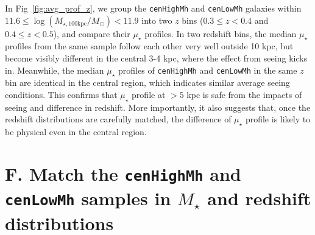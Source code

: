 \documentclass{emulateapj}
\def\rbcg{\texttt{cenHighMh}}
\def\nbcg{\texttt{cenLowMh}}
\def\mstar{{$M_{\star}$}}
\def\logmtot{{$\log (M_{\star,100\mathrm{kpc}}/M_{\odot})$}}
\def\mden{{$\mu_{\star}$}}
\begin{document}
\begin{CJK*}{UTF8}{gbsn}
    In Fig~\ref{fig:avg_prof_z}, we group the \rbcg{} and \nbcg{} galaxies within 
    $11.6 \le$\logmtot$< 11.9$ into two $z$ bins ($0.3\leq z<0.4$ and $0.4\leq z<0.5$),
    and compare their \mden{} profiles. 
    In two redshift bins, the median \mden{} profiles from the same sample follow each 
    other very well outside 10 kpc, but become visibly different in the central 3-4 kpc,
    where the effect from seeing kicks in. 
    Meanwhile, the median \mden{} profiles of \rbcg{} and \nbcg{} in the same $z$ bin 
    are identical in the central region, which indicates similar average seeing 
    conditions.       
    This confirms that \mden{} profile at $> 5$ kpc is safe from the impacts of seeing 
    and difference in redshift.
    More importantly, it also suggests that, once the redshift distributions are 
    carefully matched, the difference of \mden{} profile is likely to be physical 
    even in the central region.  


\section{F. Match the \rbcg{} and \nbcg{} samples in \mstar{} and redshift distributions}
    \label{app:match}


\end{CJK*}
\end{document}
